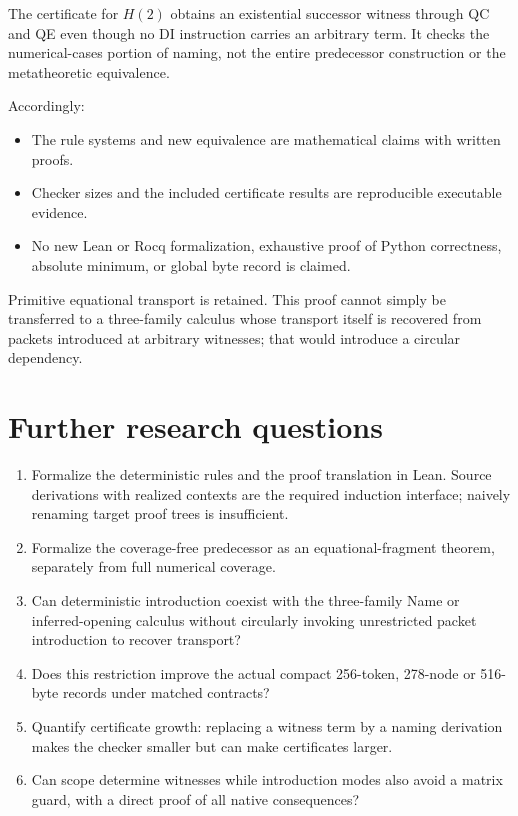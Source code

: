 \documentclass[11pt]{article}
\begin{document}
The certificate for \(H(2)\) obtains an existential successor witness
through QC and QE even though no DI instruction carries an arbitrary term.
It checks the numerical-cases portion of naming, not the entire predecessor
construction or the metatheoretic equivalence.

Accordingly:
\begin{itemize}
\item The rule systems and new equivalence are mathematical claims with
written proofs.
\item Checker sizes and the included certificate results are reproducible
executable evidence.
\item No new Lean or Rocq formalization, exhaustive proof of Python
correctness, absolute minimum, or global byte record is claimed.
\end{itemize}

Primitive equational transport is retained. This proof cannot simply be
transferred to a three-family calculus whose transport itself is recovered
from packets introduced at arbitrary witnesses; that would introduce a
circular dependency.

\section{Further research questions}

\begin{enumerate}
\item Formalize the deterministic rules and the proof translation in Lean.
Source derivations with realized contexts are the required induction
interface; naively renaming target proof trees is insufficient.
\item Formalize the coverage-free predecessor as an equational-fragment
theorem, separately from full numerical coverage.
\item Can deterministic introduction coexist with the three-family Name or
inferred-opening calculus without circularly invoking unrestricted packet
introduction to recover transport?
\item Does this restriction improve the actual compact 256-token,
278-node or 516-byte records under matched contracts?
\item Quantify certificate growth: replacing a witness term by a naming
derivation makes the checker smaller but can make certificates larger.
\item Can scope determine witnesses while introduction modes also avoid a
matrix guard, with a direct proof of all native consequences?
\end{enumerate}
\end{document}
